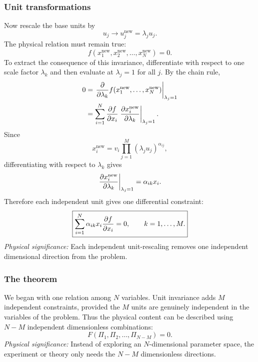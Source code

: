 \subsubsection*{Unit transformations}
Now rescale the base units by
\begin{equation}
    u_j \longrightarrow u_j^{\mathrm{new}}=\lambda_j u_j .
    \label{eq:lec05:unit-rescaling}
\end{equation}
The physical relation must remain true:
\begin{equation}
    f(x_1^{\mathrm{new}},x_2^{\mathrm{new}},\ldots,x_N^{\mathrm{new}})=0 .
    \label{eq:lec05:invariant-relation}
\end{equation}
To extract the consequence of this invariance, differentiate with respect to
one scale factor $\lambda_k$ and then evaluate at $\lambda_j=1$ for all $j$.
By the chain rule,
\begin{align}
    0
    &=
    \left.\pdv{}{\lambda_k}
    f(x_1^{\mathrm{new}},\ldots,x_N^{\mathrm{new}})
    \right|_{\lambda_j=1}
    \nonumber\\
    &=
    \sum_{i=1}^{N}
    \pdv{f}{x_i}
    \left.
    \pdv{x_i^{\mathrm{new}}}{\lambda_k}
    \right|_{\lambda_j=1}.
    \label{eq:lec05:chain-rule}
\end{align}
Since
\begin{equation*}
    x_i^{\mathrm{new}}
    =
    v_i \prod_{j=1}^{M}(\lambda_j u_j)^{\alpha_{ij}},
\end{equation*}
differentiating with respect to $\lambda_k$ gives
\begin{equation*}
    \left.
    \pdv{x_i^{\mathrm{new}}}{\lambda_k}
    \right|_{\lambda_j=1}
    =
    \alpha_{ik} x_i .
\end{equation*}
Therefore each independent unit gives one differential constraint:
\begin{equation}
    \boxed{
    \sum_{i=1}^{N}
    \alpha_{ik} x_i \pdv{f}{x_i}=0,
    \qquad k=1,\ldots,M .
    }
    \label{eq:lec05:unit-invariance-constraint}
\end{equation}
\textit{Physical significance:} Each independent unit-rescaling removes one
independent dimensional direction from the problem.

\subsubsection*{The theorem}
We began with one relation among $N$ variables. Unit invariance adds $M$
independent constraints, provided the $M$ units are genuinely independent in
the variables of the problem. Thus the physical content can be described using
$N-M$ independent dimensionless combinations:
\begin{equation}
    \boxed{
    F(\Pi_1,\Pi_2,\ldots,\Pi_{N-M})=0 .
    }
    \label{eq:lec05:buckingham-theorem}
\end{equation}
\textit{Physical significance:} Instead of exploring an $N$-dimensional
parameter space, the experiment or theory only needs the $N-M$
dimensionless directions.

